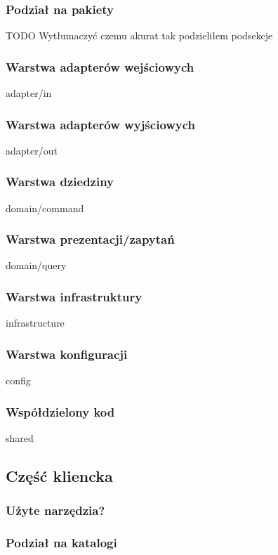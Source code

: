\subsubsection{Podział na pakiety}

TODO Wytłumaczyć czemu akurat tak podzieliłem podsekcje

\subsubsection{Warstwa adapterów wejściowych} adapter/in

\subsubsection{Warstwa adapterów wyjściowych} adapter/out

\subsubsection{Warstwa dziedziny} domain/command

\subsubsection{Warstwa prezentacji/zapytań} domain/query

\subsubsection{Warstwa infrastruktury} infrastructure

\subsubsection{Warstwa konfiguracji} config

\subsubsection{Współdzielony kod} shared


\subsection{Część kliencka}

\subsubsection{Użyte narzędzia?}

\subsubsection{Podział na katalogi}